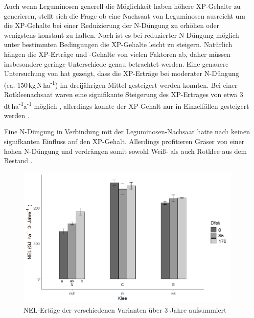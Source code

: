 Auch wenn Leguminosen generell die Möglichkeit haben höhere \ac{XP}-Gehalte zu generieren, stellt sich die Frage ob eine Nachsaat von Leguminosen ausreicht um die \ac{XP}-Gehalte bei einer Reduizierung der N-Düngung zu erhöhen oder wenigstens konstant zu halten.
Nach \textcite[11]{engel2013protein} ist es bei reduzierter N-Düngung möglich unter bestimmten Bedingungen die \ac{XP}-Gehalte leicht zu steigern.
Natürlich hängen die \ac{XP}-Erträge und -Gehalte von vielen Faktoren ab, daher müssen insbesondere geringe Unterschiede genau betrachtet werden.
Eine genauere Untersuchung von \textcite{weggler2020langzeitbeobachtungen} hat gezeigt, dass die \ac{XP}-Erträge bei moderater N-Düngung (ca. 150\,kg\,N\,ha\textsuperscript{-1}) im dreijährigen Mittel gesteigert werden konnten.
Bei einer Rotkleenachsaat waren eine signifikante Steigerung des \ac{XP}-Ertrages von etwa 3\,dt\,ha\textsuperscript{-1}a\textsuperscript{-1} möglich \parencite[12]{weggler2020langzeitbeobachtungen}, allerdings konnte der \ac{XP}-Gehalt nur in Einzelfällen gesteigert werden \parencite[13]{weggler2020langzeitbeobachtungen}.


Eine N-Düngung in Verbindung mit der Leguminosen-Nachsaat hatte nach \textcite[34]{weggler2050leguminosen} keinen signifkanten Einfluss auf den \ac{XP}-Gehalt.
Allerdings profitieren Gräser von einer hohen N-Düngung und verdrängen somit sowohl Weiß- als auch Rotklee aus dem Bestand \parencite[161]{black2009clover}.


\begin{figure}
	\includegraphics[scale=0.5]{images/wegglerAbb2}
	\caption[\ac{NEL}-Erträge der verschiedenen Varianten über 3 Jahre aufsummiert]{\ac{NEL}-Ertäge der verschiedenen Varianten über 3 Jahre aufsummiert \parencite[36]{weggler2050leguminosen}}
	\label{fig:wegglerAbb2}
\end{figure}

